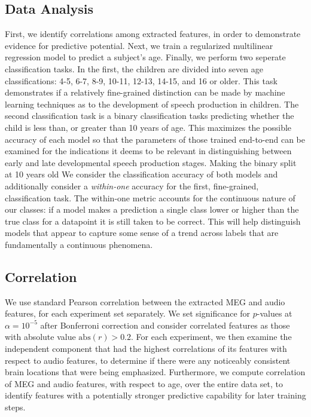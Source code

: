 \documentclass[utf8]{frontiersSCNS} %
\begin{document}
\subsection{Data Analysis}

First, we identify correlations among extracted features, in order to demonstrate evidence for predictive potential. Next, we train a regularized multilinear regression model to predict a subject's age. Finally, we perform two seperate classification tasks. In the first, the children are divided into seven age classifications: 4-5, 6-7, 8-9, 10-11, 12-13, 14-15, and 16 or older. This task demonstrates if a relatively fine-grained distinction can be made by machine learning techniques as to the development of speech production in children. The second classification task is a binary classification tasks predicting whether the child is less than, or greater than 10 years of age. This maximizes the possible accuracy of each model so that the parameters of those trained end-to-end can be examined for the indications it deems to be relevant in distinguishing between early and late developmental speech production stages. Making the binary split at 10 years old  We consider the classification accuracy of both models and additionally consider a {\em within-one} accuracy for the first, fine-grained, classification task. The within-one metric accounts for the continuous nature of our classes: if a model makes a prediction a single class lower or higher than the true class for a datapoint it is still taken to be correct. This will help distinguish models that appear to capture some sense of a trend across labels that are fundamentally a continuous phenomena.

\subsection{Correlation}

We use standard Pearson correlation between the extracted MEG and audio features, for each experiment set separately. We set significance for $p$-values at $\alpha = 10^{-5}$ after Bonferroni correction and consider correlated features as those with absolute value $\text{abs}(r) > 0.2$. For each experiment, we then examine the independent component that had the highest correlations of its features with respect to audio features, to determine if there were any noticeably consistent brain locations that were being emphasized. Furthermore, we compute correlation of MEG and audio features, with respect to age, over the entire data set, to identify features with a potentially stronger predictive capability for later training steps.
\end{document}
